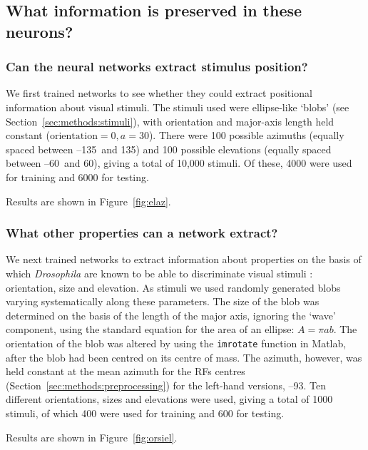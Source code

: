\subsection{What information is preserved in these neurons?}

\subsubsection{Can the neural networks extract stimulus position?}
We first trained networks to see whether they could extract positional information about visual stimuli.
The stimuli used were ellipse-like `blobs' (see Section~\ref{sec:methods:stimuli}), with orientation and major-axis length held constant ($\mathrm{orientation} = 0, a = 30$).
There were 100 possible azimuths (equally spaced between --135\degree\ and 135\degree) and 100 possible elevations (equally spaced between --60\degree\ and 60\degree), giving a total of 10,000 stimuli.
Of these, 4000 were used for training and 6000 for testing.

Results are shown in Figure~\ref{fig:elaz}.

\subsubsection{What other properties can a network extract?}
We next trained networks to extract information about properties on the basis of which \emph{Drosophila} are known to be able to discriminate visual stimuli \cite{Liu2006}: orientation, size and elevation.
As stimuli we used randomly generated blobs varying systematically along these parameters.
The size of the blob was determined on the basis of the length of the major axis, ignoring the `wave' component, using the standard equation for the area of an ellipse: $A = \pi ab$.
The orientation of the blob was altered by using the \texttt{imrotate} function in Matlab, after the blob had been centred on its centre of mass.
The azimuth, however, was held constant at the mean azimuth for the RFs centres (Section~\ref{sec:methods:preprocessing}) for the left-hand versions, --93\degree.
Ten different orientations, sizes and elevations were used, giving a total of 1000 stimuli, of which 400 were used for training and 600 for testing.

Results are shown in Figure~\ref{fig:orsiel}.